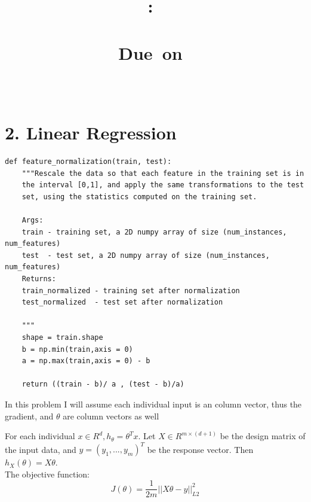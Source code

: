 \documentclass{article}
\title{
    \vspace{2in}
    \textmd{\textbf{\hmwkClass:\ \hmwkTitle \\ \hmwksubtitle }}\\
    \vspace{1in}
    \normalsize\vspace{0.1in}\small{Due\ on\ \hmwkDueDate}\\
    \vspace{0.1in}\large{\textit{\hmwkClassInstructor}}
    \vspace{3in}
}
\author{\textbf{\hmwkAuthorName} \\ \textbf{\hmwknetid }}
\date{}
\newenvironment{problem}[2][$\bullet$]{\begin{trivlist}\large
		\item[\hskip \labelsep {\bfseries #1}\hskip \labelsep {\bfseries #2.}]}  {\end{trivlist}}
\newenvironment{sub}[2][$-$]{\begin{trivlist}
		\item[\hskip \labelsep {\bfseries #1}\hskip \labelsep {\bfseries #2.}]}  {\end{trivlist}}
\begin{document}
\maketitle

\pagebreak


%

\section{2. Linear Regression }
\begin{problem}{\large{2.1 Feature Normalization}}
\end{problem}

\begin{verbatim}
def feature_normalization(train, test):
	"""Rescale the data so that each feature in the training set is in
	the interval [0,1], and apply the same transformations to the test
	set, using the statistics computed on the training set.
	
	Args:
	train - training set, a 2D numpy array of size (num_instances, num_features)
	test  - test set, a 2D numpy array of size (num_instances, num_features)
	Returns:
	train_normalized - training set after normalization
	test_normalized  - test set after normalization
	
	"""
	shape = train.shape
	b = np.min(train,axis = 0)
	a = np.max(train,axis = 0) - b
	
	return ((train - b)/ a , (test - b)/a)
\end{verbatim}


\begin{problem}{2.2 Gradient Descent Setup}
\end{problem}

In this problem I will assume each individual input is an column vector, thus the gradient, and $\theta$ are column vectors as well


\begin{sub}{2.2.1}
\end{sub}

For each individual $x \in R^d, h_{\theta} = \theta^T x$. Let $X \in R^{m\times (d +1)}$ be the design matrix of the input data, and $y = (y_1, ... ,y_m)^T$ be the response vector. Then $h_X(\theta) = X \theta$. \\The objective function: 
 $$J(\theta) = \frac{1}{2m} ||X \theta - y||_{L2}^2$$

\begin{sub}{2.2.2}
\end{sub}
\end{document}
